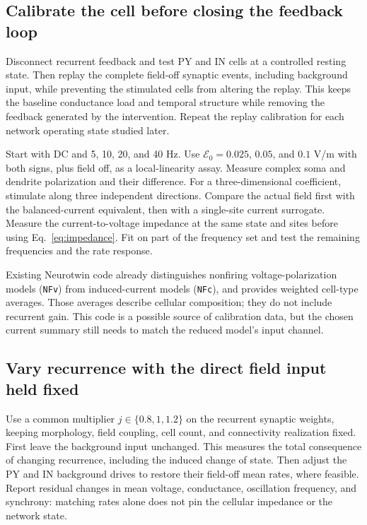 \documentclass[11pt,a4paper]{article}
\newcommand{\E}{\mathcal E}
\begin{document}
\subsection{Calibrate the cell before closing the feedback loop}

Disconnect recurrent feedback and test PY and IN cells at a controlled resting state. Then replay the complete field-off synaptic events, including background input, while preventing the stimulated cells from altering the replay. This keeps the baseline conductance load and temporal structure while removing the feedback generated by the intervention. Repeat the replay calibration for each network operating state studied later.

Start with DC and 5, 10, 20, and 40 Hz. Use $\E_0=0.025$, $0.05$, and $0.1$ V/m with both signs, plus field off, as a local-linearity assay. Measure complex soma and dendrite polarization and their difference. For a three-dimensional coefficient, stimulate along three independent directions. Compare the actual field first with the balanced-current equivalent, then with a single-site current surrogate. Measure the current-to-voltage impedance at the same state and sites before using Eq.~\eqref{eq:impedance}. Fit on part of the frequency set and test the remaining frequencies and the rate response.

Existing Neurotwin code already distinguishes nonfiring voltage-polarization models (\texttt{NFv}) from induced-current models (\texttt{NFc}), and provides weighted cell-type averages. Those averages describe cellular composition; they do not include recurrent gain. This code is a possible source of calibration data, but the chosen current summary still needs to match the reduced model's input channel.

\subsection{Vary recurrence with the direct field input held fixed}

Use a common multiplier $j\in\{0.8,1,1.2\}$ on the recurrent synaptic weights, keeping morphology, field coupling, cell count, and connectivity realization fixed. First leave the background input unchanged. This measures the total consequence of changing recurrence, including the induced change of state. Then adjust the PY and IN background drives to restore their field-off mean rates, where feasible. Report residual changes in mean voltage, conductance, oscillation frequency, and synchrony: matching rates alone does not pin the cellular impedance or the network state.
\end{document}

